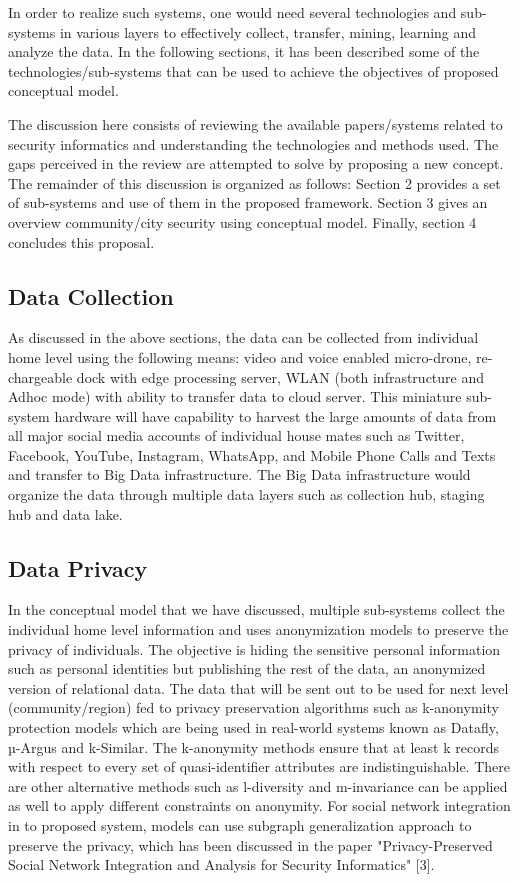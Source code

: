 \documentclass[sigconf]{acmart}
\begin{document}
In order to realize such systems, one would need several technologies and sub-systems in various layers to effectively collect, transfer, mining, learning and analyze the data. In the following sections, it has been described some of the technologies/sub-systems that can be used to achieve the objectives of proposed conceptual model.

The discussion here consists of reviewing the available papers/systems related to security informatics and understanding the technologies and methods used. The gaps perceived in the review are attempted to solve by proposing a new concept. The remainder of this discussion is organized as follows: Section 2 provides a set of sub-systems and use of them in the proposed framework. Section 3 gives an overview community/city security using conceptual model. Finally, section 4 concludes this proposal.

\subsection{Data Collection}
As discussed in the above sections, the data can be collected from individual home level using the following means: video and voice enabled micro-drone, re-chargeable dock with edge processing server, WLAN (both infrastructure and Adhoc mode) with ability to transfer data to cloud server. This miniature sub-system hardware will have capability to harvest the large amounts of data from all major social media accounts of individual house mates such as Twitter, Facebook, YouTube, Instagram, WhatsApp, and Mobile Phone Calls and Texts and transfer to Big Data infrastructure. The Big Data infrastructure would organize the data through multiple data layers such as collection hub, staging hub and data lake.

\subsection{Data Privacy}
In the conceptual model that we have discussed, multiple sub-systems collect the individual home level information and uses anonymization models to preserve the privacy of individuals. The objective is hiding the sensitive personal information such as personal identities but publishing the rest of the data, an anonymized version of relational data. The data that will be sent out to be used for next level (community/region) fed to privacy preservation algorithms such as k-anonymity protection models which are being used in real-world systems known as Datafly, µ-Argus and k-Similar. The k-anonymity methods ensure that at least k records with respect to every set of quasi-identifier attributes are indistinguishable. There are other alternative methods such as l-diversity and m-invariance can be applied as well to apply different constraints on anonymity. For social network integration in to proposed system, models can use subgraph generalization approach to preserve the privacy, which has been discussed in the paper "Privacy-Preserved Social Network Integration and Analysis for Security Informatics" [3].
\end{document}
